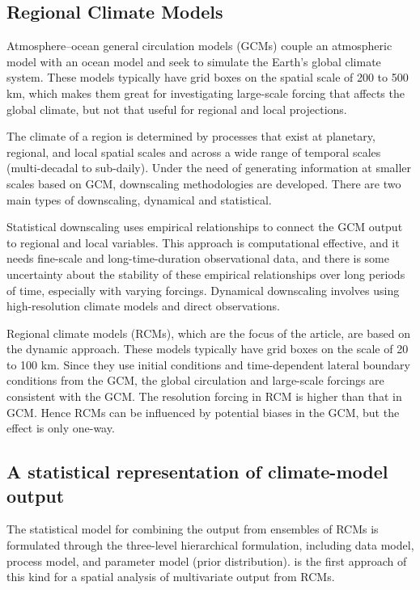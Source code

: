 \documentclass[12pt]{amsart}
\begin{document}
\subsection{Regional Climate Models}

Atmosphere–ocean general circulation models (GCMs) couple an atmospheric model with an ocean model and seek to simulate the Earth’s global climate system. These models typically have grid boxes on the spatial scale of 200 to 500 km, which makes them great for investigating large-scale forcing that affects the global climate, but not that useful for regional and local projections.

The climate of a region is determined by processes that exist at planetary, regional, and local spatial scales and across a wide range of temporal scales (multi-decadal to sub-daily). Under the need of generating information at smaller scales based on GCM, downscaling methodologies are developed. There are two main types of downscaling, dynamical and statistical. 

Statistical downscaling uses empirical relationships to connect the GCM output to regional and local variables. This approach is computational effective, and it needs fine-scale and long-time-duration observational data, and there is some uncertainty about the stability of these empirical relationships over long periods of time, especially with varying forcings. Dynamical downscaling involves using high-resolution climate models and direct observations. 

Regional climate models (RCMs), which are the focus of the article, are based on the dynamic approach. These models typically have grid boxes on the scale of 20 to 100 km. Since they use initial conditions and time-dependent lateral boundary conditions from the GCM, the global circulation and large-scale forcings are consistent with the GCM. The resolution forcing in RCM is higher than that in GCM. Hence RCMs can be influenced by potential biases in the GCM, but the effect is only one-way.

\subsection{A statistical representation of climate-model output}

The statistical model for combining the output from ensembles of RCMs is formulated through the three-level hierarchical formulation, including data model, process model, and parameter model (prior distribution). \cite{paper} is the first approach of this kind for a spatial analysis of multivariate output from RCMs.
\end{document}

